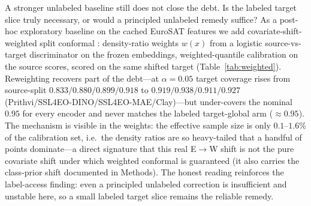 \documentclass[11pt]{article}
\begin{document}
A stronger unlabeled baseline still does not close the debt. Is the labeled target slice truly
necessary, or would a principled unlabeled remedy suffice? As a post-hoc exploratory baseline on the
cached EuroSAT features we add covariate-shift-weighted split conformal \citep{tibshirani2019covariate}:
density-ratio weights $w(x)$ from a logistic source-vs-target discriminator on the frozen embeddings,
weighted-quantile calibration on the source scores, scored on the same shifted target
(Table~\ref{tab:weighted}). Reweighting recovers part of the debt---at $\alpha=0.05$ target coverage
rises from source-split $0.833/0.880/0.899/0.918$ to $0.919/0.938/0.911/0.927$
(Prithvi/SSL4EO-DINO/SSL4EO-MAE/Clay)---but under-covers the nominal $0.95$ for every encoder and
never matches the labeled target-global arm (${\approx}0.95$). The mechanism is visible in the weights: the
effective sample size is only $0.1$--$1.6\%$ of the calibration set, i.e.\ the density ratios are so
heavy-tailed that a handful of points dominate---a direct signature that this real E$\to$W shift is
not the pure covariate shift under which weighted conformal is guaranteed (it also carries the
class-prior shift documented in Methods). The honest reading reinforces the label-access finding: even a
principled unlabeled correction is insufficient and unstable here, so a small labeled
target slice remains the reliable remedy.
\end{document}
